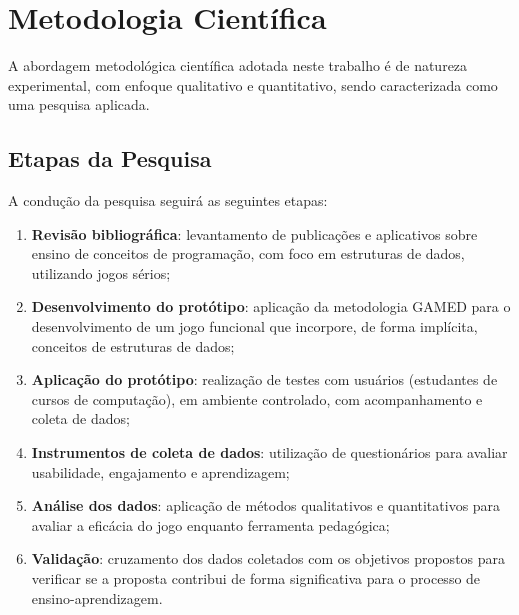 \section{Metodologia Científica}

A abordagem metodológica científica adotada neste trabalho é de natureza experimental, com enfoque qualitativo e quantitativo, sendo caracterizada como uma pesquisa aplicada.

\subsection{Etapas da Pesquisa}

A condução da pesquisa seguirá as seguintes etapas:

\begin{enumerate}
  \item \textbf{Revisão bibliográfica}: levantamento de publicações e aplicativos sobre ensino de conceitos de programação, com foco em estruturas de dados, utilizando jogos sérios;
  \item \textbf{Desenvolvimento do protótipo}: aplicação da metodologia GAMED para o desenvolvimento de um jogo funcional que incorpore, de forma implícita, conceitos de estruturas de dados;
  \item \textbf{Aplicação do protótipo}: realização de testes com usuários (estudantes de cursos de computação), em ambiente controlado, com acompanhamento e coleta de dados;
  \item \textbf{Instrumentos de coleta de dados}: utilização de questionários para avaliar usabilidade, engajamento e aprendizagem;
  \item \textbf{Análise dos dados}: aplicação de métodos qualitativos e quantitativos para avaliar a eficácia do jogo enquanto ferramenta pedagógica;
  \item \textbf{Validação}: cruzamento dos dados coletados com os objetivos propostos para verificar se a proposta contribui de forma significativa para o processo de ensino-aprendizagem.
\end{enumerate}
